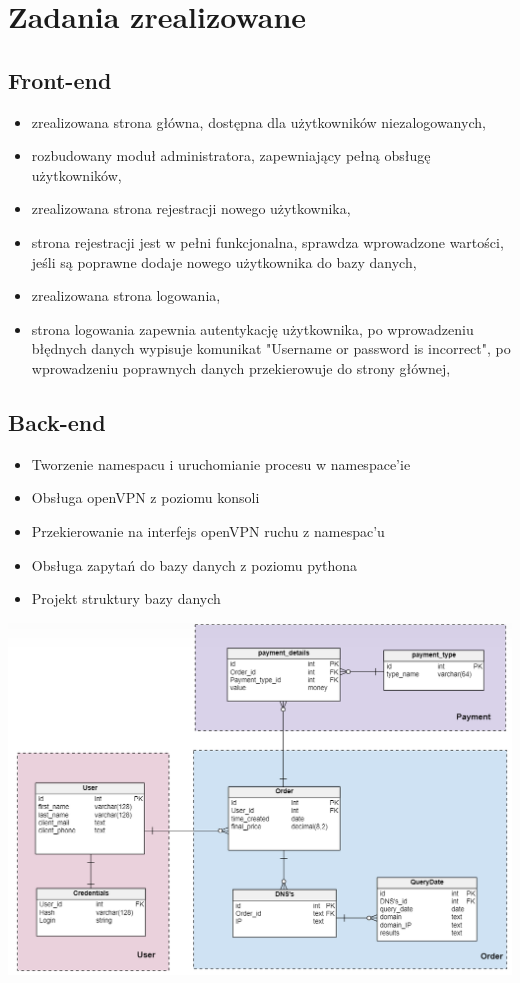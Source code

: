 \section{Zadania zrealizowane}

\subsection*{Front-end}
\begin{itemize}
  \item zrealizowana strona główna, dostępna dla użytkowników niezalogowanych,
  \item rozbudowany moduł administratora, zapewniający pełną obsługę użytkowników,
  \item zrealizowana strona rejestracji nowego użytkownika,
  \item strona rejestracji jest w pełni funkcjonalna, sprawdza wprowadzone wartości, jeśli są poprawne dodaje nowego użytkownika do bazy danych, 
  \item zrealizowana strona logowania,
  \item strona logowania zapewnia autentykację użytkownika, po wprowadzeniu błędnych danych wypisuje komunikat "Username or password is incorrect", po wprowadzeniu poprawnych danych przekierowuje do strony głównej, 
\end{itemize}

\subsection*{Back-end}
\begin{itemize}
  \item Tworzenie namespacu i uruchomianie procesu w namespace'ie 
  \item Obsługa openVPN z poziomu konsoli 
  \item Przekierowanie na interfejs openVPN ruchu z namespac'u 
  \item Obsługa zapytań do bazy danych z poziomu pythona
  \item Projekt struktury bazy danych
\end{itemize}

\newpage

\includegraphics[scale=0.6]{db_schema.png}
